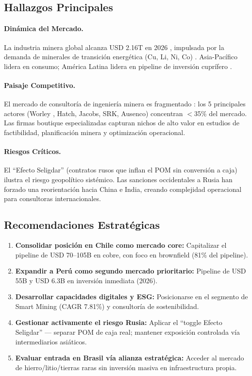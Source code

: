 \subsection{Hallazgos Principales}

\paragraph{Dinámica del Mercado.} La industria minera global alcanza USD 2.16T en 2026 \cite{researchandmarkets2026}, impulsada por la demanda de minerales de transición energética (Cu, Li, Ni, Co) \cite{iea2026}. Asia-Pacífico lidera en consumo; América Latina lidera en pipeline de inversión cuprífero \cite{bnamericas2026}.

\paragraph{Paisaje Competitivo.} El mercado de consultoría de ingeniería minera es fragmentado \cite{dataintelo2025}: los 5 principales actores (Worley \cite{worley2025}, Hatch, Jacobs, SRK, Ausenco) concentran $<$35\% del mercado. Las firmas boutique especializadas capturan nichos de alto valor en estudios de factibilidad, planificación minera y optimización operacional.

\paragraph{Riesgos Críticos.} El ``Efecto Seligdar'' (contratos rusos \cite{seligdar2025} que inflan el POM sin conversión a caja) ilustra el riesgo geopolítico sistémico. Las sanciones occidentales a Rusia han forzado una reorientación hacia China e India, creando complejidad operacional para consultoras internacionales.

\subsection{Recomendaciones Estratégicas}

\begin{recommendationbox}
\begin{enumerate}
    \item \textbf{Consolidar posición en Chile como mercado core:} Capitalizar el pipeline de USD 70--105B en cobre, con foco en brownfield (81\% del pipeline).
    \item \textbf{Expandir a Perú como segundo mercado prioritario:} Pipeline de USD 55B y USD 6.3B en inversión inmediata (2026).
    \item \textbf{Desarrollar capacidades digitales y ESG:} Posicionarse en el segmento de Smart Mining (CAGR 7.81\%) y consultoría de sostenibilidad.
    \item \textbf{Gestionar activamente el riesgo Rusia:} Aplicar el ``toggle Efecto Seligdar'' — separar POM de caja real; mantener exposición controlada vía intermediarios asiáticos.
    \item \textbf{Evaluar entrada en Brasil vía alianza estratégica:} Acceder al mercado de hierro/litio/tierras raras sin inversión masiva en infraestructura propia.
\end{enumerate}
\end{recommendationbox}
